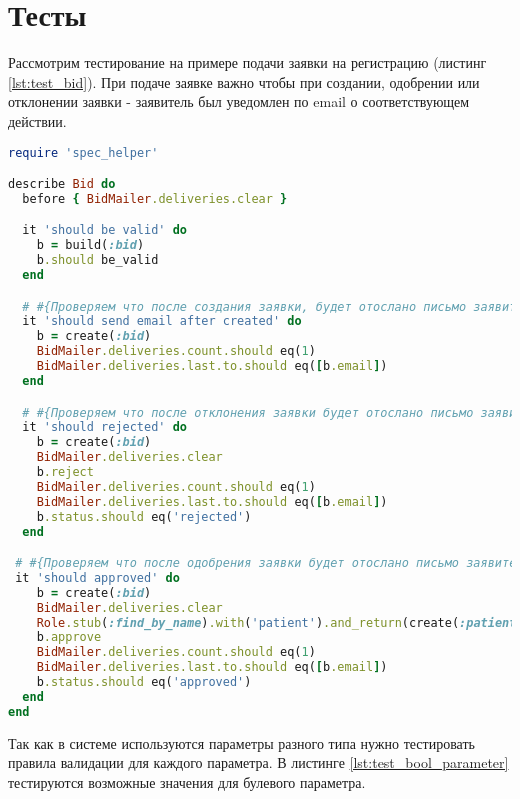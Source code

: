 \section{Тесты}
Рассмотрим тестирование на примере подачи заявки на регистрацию (листинг
\ref{lst:test_bid}).
При подаче заявке важно чтобы при создании, одобрении или отклонении заявки -
заявитель был уведомлен по email о соответствующем действии.

\begin{lstlisting}[language=Ruby,caption=Тестирование подачи заявки
,label={lst:test_bid}] 
require 'spec_helper'

describe Bid do
  before { BidMailer.deliveries.clear }

  it 'should be valid' do
    b = build(:bid)
    b.should be_valid
  end

  # #{Проверяем что после создания заявки, будет отослано письмо заявителю}
  it 'should send email after created' do
    b = create(:bid)
    BidMailer.deliveries.count.should eq(1)
    BidMailer.deliveries.last.to.should eq([b.email])
  end

  # #{Проверяем что после отклонения заявки будет отослано письмо заявителю}
  it 'should rejected' do
    b = create(:bid)
    BidMailer.deliveries.clear
    b.reject
    BidMailer.deliveries.count.should eq(1)
    BidMailer.deliveries.last.to.should eq([b.email])
    b.status.should eq('rejected')
  end

 # #{Проверяем что после одобрения заявки будет отослано письмо заявителю}
 it 'should approved' do
    b = create(:bid)
    BidMailer.deliveries.clear
    Role.stub(:find_by_name).with('patient').and_return(create(:patient_role))
    b.approve
    BidMailer.deliveries.count.should eq(1)
    BidMailer.deliveries.last.to.should eq([b.email])
    b.status.should eq('approved')
  end
end
\end{lstlisting}

Так как в системе используются параметры разного типа нужно тестировать правила
валидации для каждого параметра. В листинге \ref{lst:test_bool_parameter} тестируются
возможные значения для булевого параметра.

